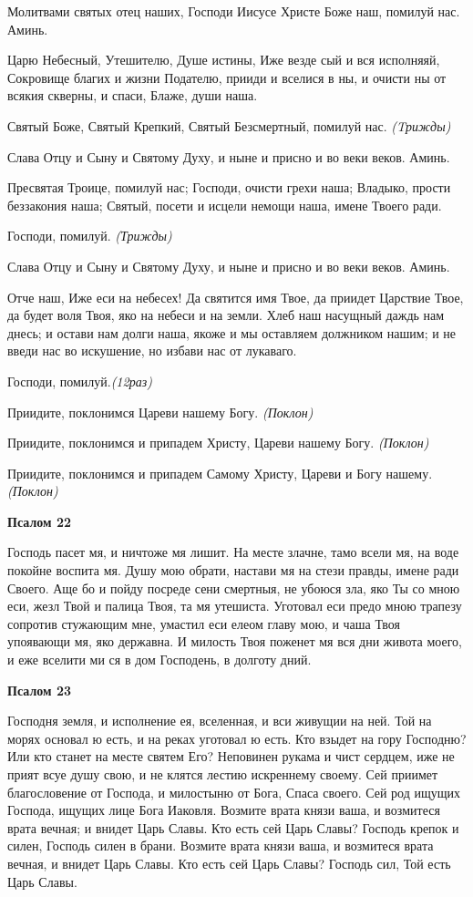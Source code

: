 Молитвами святых отец наших, Господи Иисусе Христе Боже наш, помилуй нас. Аминь.


Царю Небесный, Утешителю, Душе истины, Иже везде сый и вся исполняяй, Сокровище благих и жизни Подателю, прииди и вселися в ны, и очисти ны от всякия скверны, и спаси, Блаже, души наша.


Святый Боже, Святый Крепкий, Святый Безсмертный, помилуй нас. \itshape (Tрижды)\normalfont{}


Слава Отцу и Сыну и Святому Духу, и ныне и присно и во веки веков. Аминь.


Пресвятая Троице, помилуй нас; Господи, очисти грехи наша; Владыко, прости беззакония наша; Святый, посети и исцели немощи наша, имене Твоего ради.


Господи, помилуй. \itshape (Трижды)\normalfont{}


Слава Отцу и Сыну и Святому Духу, и ныне и присно и во веки веков. Аминь.


Отче наш, Иже еси на небесех! Да святится имя Твое, да приидет Царствие Твое, да будет воля Твоя, яко на небеси и на земли. Хлеб наш насущный даждь нам днесь; и остави нам долги наша, якоже и мы оставляем должником нашим; и не введи нас во искушение, но избави нас от лукаваго.


Господи, помилуй.\itshape  (12раз)\normalfont{}


Приидите, поклонимся Цареви нашему Богу. \itshape (Поклон)\normalfont{}


Приидите, поклонимся и припадем Христу, Цареви нашему Богу. \itshape (Поклон)\normalfont{}


Приидите, поклонимся и припадем Самому Христу, Цареви и Богу нашему.\itshape (Поклон)\normalfont{}


\medskip
\bfseries Псалом 22\normalfont{}


Господь пасет мя, и ничтоже мя лишит. На месте злачне, тамо всели мя, на воде покойне воспита мя. Душу мою обрати, настави мя на стези правды, имене ради Своего. Аще бо и пойду посреде сени смертныя, не убоюся зла, яко Ты со мною еси, жезл Твой и палица Твоя, та мя утешиста. Уготовал еси предо мною трапезу сопротив стужающим мне, умастил еси елеом главу мою, и чаша Твоя упоявающи мя, яко державна. И милость Твоя поженет мя вся дни живота моего, и еже вселити ми ся в дом Господень, в долготу дний.


\medskip
\bfseries Псалом 23\normalfont{}


Господня земля, и исполнение ея, вселенная, и вси живущии на ней. Той на морях основал ю есть, и на реках уготовал ю есть. Кто взыдет на гору Господню? Или кто станет на месте святем Его? Неповинен рукама и чист сердцем, иже не прият всуе душу свою, и не клятся лестию искреннему своему. Сей приимет благословение от Господа, и милостыню от Бога, Спаса своего. Сей род ищущих Господа, ищущих лице Бога Иаковля. Возмите врата князи ваша, и возмитеся врата вечная; и внидет Царь Славы. Кто есть сей Царь Славы? Господь крепок и силен, Господь силен в брани. Возмите врата князи ваша, и возмитеся врата вечная, и внидет Царь Славы. Кто есть сей Царь Славы? Господь сил, Той есть Царь Славы.


